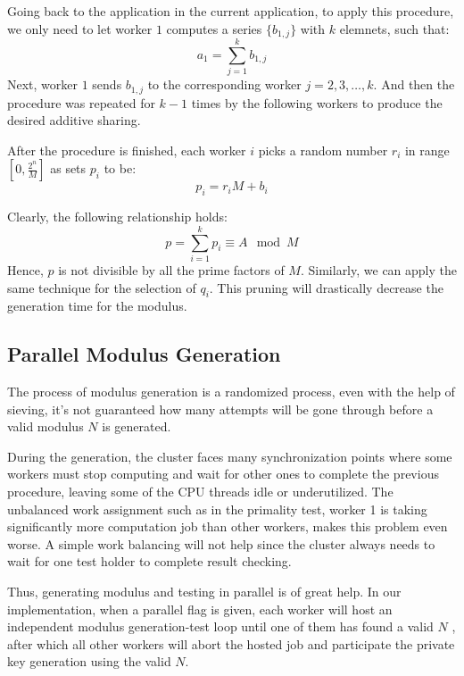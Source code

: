 Going back to the application in the current application, to apply this procedure, we only need to let worker $1$ computes a series $\{b_{1,j}\}$ with $k$ elemnets, such that:
\begin{equation}
  a_1 = \sum_{j=1}^k b_{1,j}
\end{equation}
Next, worker $1$ sends $b_{1,j}$ to the corresponding worker $j = 2, 3, \dots, k$. And then the procedure was repeated for $k-1$ times by the following workers to produce the desired additive sharing.

After the procedure is finished, each worker $i$ picks a random number $r_i$ in range $\left[0, \frac{2^n}{M}\right]$ as sets $p_i$ to be:
\begin{equation}
  p_i = r_iM + b_i
\end{equation}

Clearly, the following relationship holds:
\begin{equation}
  p = \sum_{i=1}^k p_i \equiv A \mod M
\end{equation}
Hence, $p$ is not divisible by all the prime factors of $M$. Similarly, we can apply the same technique for the selection of $q_i$. This pruning will drastically decrease the generation time for the modulus.

\subsection{Parallel Modulus Generation}

The process of modulus generation is a randomized process, even with the help of
sieving, it's not guaranteed how many attempts will be gone through before a valid
modulus $N$ is generated.

During the generation, the cluster faces many synchronization points where some
workers must stop computing and wait for other ones to complete the previous
procedure, leaving some of the CPU threads idle or underutilized. The unbalanced
work assignment such as in the primality test, worker 1 is taking significantly more computation job than other workers, makes this problem even worse. A simple work balancing will not help since the cluster always needs to wait for one test holder to complete result checking.

Thus, generating modulus and testing in parallel is of great help. In our implementation, when a parallel flag is given, each worker will host an independent modulus generation-test loop until one of them has found a valid $N$ , after which all other workers will abort the hosted job and participate the private key generation using the valid $N$.

